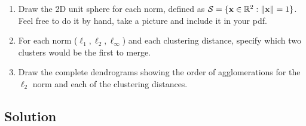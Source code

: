 \documentclass[submit]{harvardml}
\begin{document}
\begin{problem}
		\begin{enumerate}
			\item Draw the 2D unit sphere for each norm,
			defined as $\mathcal{S} = \{\mathbf{x} \in \mathbb{R}^2: \|\mathbf{x}\| = 1 \}$. Feel free to do
			it by hand, take a picture and include it in your pdf.
			\item  For each norm ($\ell_1, \ell_2, \ell_\infty$) and each clustering distance, specify which two clusters would
			be the first to merge.
			\item Draw the complete dendrograms showing the order of agglomerations for the $\ell_2$ norm and each of the clustering distances.
		\end{enumerate}
		
		
	\end{problem}
	
	\subsection*{Solution}
	
\end{document}
